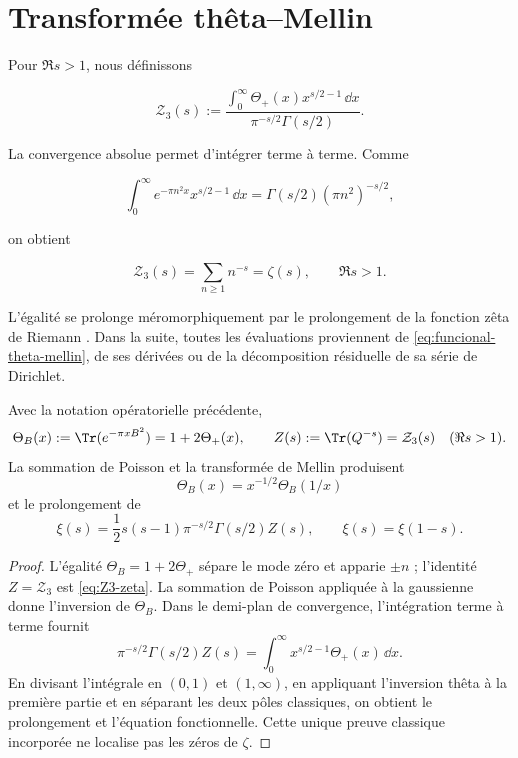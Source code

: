 \section{Transformée thêta--Mellin}

Pour $\Re s>1$, nous définissons

\begin{equation}
 \mathcal Z_{3}(s)
 :=
 \frac{\displaystyle
 \int_0^\infty\Theta_+(x)x^{s/2-1}\,\dd x}
 {\pi^{-s/2}\Gamma(s/2)}.
 \label{eq:funcional-theta-mellin}
\end{equation}

La convergence absolue permet d'intégrer terme à terme. Comme

\[
 \int_0^\infty e^{-\pi n^2x}x^{s/2-1}\,\dd x
 =\Gamma(s/2)(\pi n^2)^{-s/2},
\]

on obtient

\begin{equation}
 \mathcal Z_3(s)=\sum_{n\geq1}n^{-s}=\zeta(s),
 \qquad \Re s>1.
 \label{eq:Z3-zeta}
\end{equation}

L'égalité se prolonge méromorphiquement par le prolongement de la fonction
zêta de Riemann \cite{Apostol1976}. Dans la suite, toutes les évaluations
proviennent de \eqref{eq:funcional-theta-mellin}, de ses dérivées ou de la
décomposition résiduelle de sa série de Dirichlet.

\begin{theorem}
\label{pf84:C05}
Avec la notation opératorielle précédente,
\[
 \Theta_B(x):=\Tr(e^{-\pi xB^2})
 =1+2\Theta_+(x),
 \qquad
 Z(s):=\Tr(Q^{-s})=\mathcal Z_3(s)
 \quad(\Re s>1).
\]
La sommation de Poisson et la transformée de Mellin produisent
\[
 \Theta_B(x)=x^{-1/2}\Theta_B(1/x)
\]
et le prolongement de
\[
 \xi(s)=\frac12s(s-1)\pi^{-s/2}\Gamma(s/2)Z(s),
 \qquad
 \xi(s)=\xi(1-s).
\]
\end{theorem}

\begin{proof}
L'égalité \(\Theta_B=1+2\Theta_+\) sépare le mode zéro et apparie
\(\pm n\) ; l'identité \(Z=\mathcal Z_3\) est
\eqref{eq:Z3-zeta}. La sommation de Poisson appliquée à la gaussienne donne
l'inversion de \(\Theta_B\). Dans le demi-plan de convergence, l'intégration
terme à terme fournit
\[
 \pi^{-s/2}\Gamma(s/2)Z(s)
 =\int_0^\infty x^{s/2-1}\Theta_+(x)\,\dd x.
\]
En divisant l'intégrale en \((0,1)\) et \((1,\infty)\), en appliquant l'inversion
thêta à la première partie et en séparant les deux pôles classiques, on obtient le
prolongement et l'équation fonctionnelle. Cette unique preuve classique incorporée
ne localise pas les zéros de \(\zeta\).
\end{proof}

